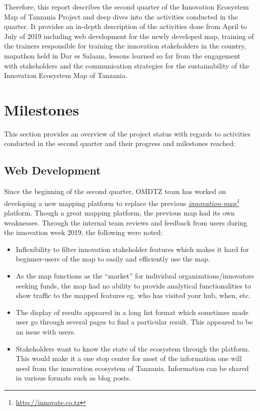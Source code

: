 \documentclass[a4paper,12pt,twoside]{article}
\begin{document}
Therefore, this report describes the second quarter of the Innovation Ecosystem Map of Tanzania Project and deep dives into the activities conducted in the quarter. It provides an in-depth description of the activities done from April to July of 2019 including web development for the newly developed map, training of the trainers responsible for training the innovation stakeholders in the country, mapathon held in Dar es Salaam, lessons learned so far from the engagement with stakeholders and the communication strategies for the sustainability of the Innovation Ecosystem Map of Tanzania.



\section{Milestones}
This section provides an overview of the project status with regards to activities conducted in the second quarter and their progress and milestones reached:

\subsection{Web Development}
Since the beginning of the second quarter, OMDTZ team has worked on developing a new mapping platform to replace the previous \textit{\href{http://innovate.co.tz}{innovation-map}\footnote{\url{http://innovate.co.tz}}} platform. Though a great mapping platform, the previous map had its own weaknesses. Through the internal team reviews and feedback from users during the innovation week 2019, the following were noted:

\begin{itemize}
    \item Inflexibility to filter innovation stakeholder features which makes it hard for beginner-users of the map to easily and efficiently use the map.
    \item As the map functions as the “market” for individual organizations/innovators seeking funds, the map had no ability to provide analytical functionalities to show traffic to the mapped features eg. who has visited your hub, when, etc.
    \item The display of results appeared in a long list format which sometimes made user go through several pages to find a particular result. This appeared to be an issue with users.
    \item Stakeholders want to know the state of the ecosystem through the platform. This would make it a one stop center for most of the information one will need from the innovation ecosystem of Tanzania. Information can be shared in various formats such as blog posts.
\end{itemize}
\end{document}
